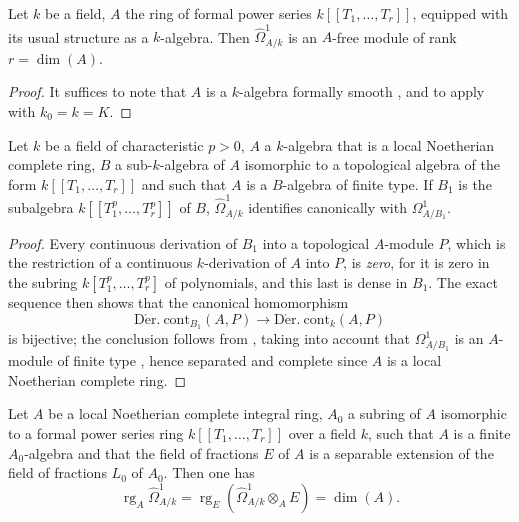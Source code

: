 \begin{corollary}[21.9.3]
\label{0.21.9.3}
Let $k$ be a field, $A$ the ring of formal power series $k[[T_1,\ldots,T_r]]$, equipped with its usual structure as a $k$-algebra.
Then $\widehat{\Omega}^1_{A/k}$ is an $A$-free module of rank $r=\dim(A)$.
\end{corollary}

\begin{proof}
It suffices to note that $A$ is a $k$-algebra formally smooth , and to apply  with $k_0=k=K$.
\end{proof}

\begin{lemma}[21.9.4]
\label{0.21.9.4}
Let $k$ be a field of characteristic $p>0$, $A$ a $k$-algebra that is a local Noetherian complete ring, $B$ a sub-$k$-algebra of $A$ isomorphic to a topological algebra of the form $k[[T_1,\ldots,T_r]]$ and such that $A$ is a $B$-algebra of finite type.
If $B_1$ is the subalgebra $k[[T_1^p,\ldots,T_r^p]]$ of $B$, $\widehat{\Omega}^1_{A/k}$ identifies canonically with $\Omega^1_{A/B_1}$.
\end{lemma}

\begin{proof}
Every continuous derivation of $B_1$ into a topological $A$-module $P$, which is the restriction of a continuous $k$-derivation of $A$ into $P$, is \emph{zero}, for it is zero in the subring $k[T_1^p,\ldots,T_r^p]$ of polynomials, and this last is dense in $B_1$.
The exact sequence  then shows that the canonical homomorphism
\[
  \operatorname{D\acute{e}r.\ cont}_{B_1}(A,P)\to\operatorname{D\acute{e}r.\ cont}_k(A,P)
\]
is bijective; the conclusion follows from , taking into account that $\Omega^1_{A/B_1}$ is an $A$-module of finite type , hence separated and complete since $A$ is a local Noetherian complete ring.
\end{proof}

\begin{proposition}[21.9.5]
\label{0.21.9.5}
Let $A$ be a local Noetherian complete integral ring, $A_0$ a subring of $A$ isomorphic to a formal power series ring $k[[T_1,\ldots,T_r]]$ over a field $k$, such that $A$ is a \textup{finite} $A_0$-algebra and that the field of fractions $E$ of $A$ is a \textup{separable} extension of the field of fractions $L_0$ of $A_0$.
Then one has
\begin{equation}
\tag{21.9.5.1}
  \label{0.21.9.5.1}
  \operatorname{rg}_A\widehat{\Omega}^1_{A/k}=\operatorname{rg}_E(\widehat{\Omega}^1_{A/k}\otimes_A E)=\dim(A).
\end{equation}
\end{proposition}

